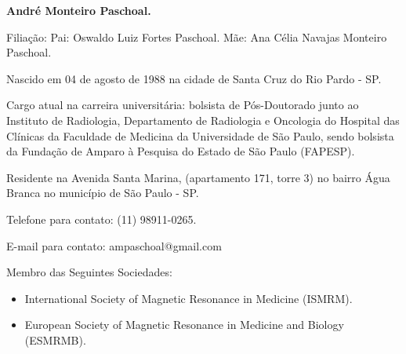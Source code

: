 \documentclass[a4paper,oneside,10pt]{article}
\begin{document}
\begin{itemize}
        \large{\item \textbf{André Monteiro Paschoal.}}
        \item Filiação: \newline
        Pai: Oswaldo Luiz Fortes Paschoal. \newline
        Mãe: Ana Célia Navajas Monteiro Paschoal.
        \item Nascido em 04 de agosto de 1988 na cidade de Santa Cruz do Rio Pardo - SP.
        \item Cargo atual na carreira universitária: bolsista de Pós-Doutorado junto ao Instituto de Radiologia, Departamento de Radiologia e Oncologia do Hospital das Clínicas da Faculdade de Medicina da Universidade de São Paulo, sendo bolsista da Fundação de Amparo à Pesquisa do Estado de São Paulo (FAPESP).
        \item Residente na Avenida Santa Marina, (apartamento 171, torre 3) no bairro Água Branca no município de São Paulo - SP.
        \item Telefone para contato: (11) 98911-0265.
        \item E-mail para contato: ampaschoal@gmail.com 
        \item Membro das Seguintes Sociedades:
        \begin{itemize}
                \item International Society of Magnetic Resonance in Medicine (ISMRM).
                \item European Society of Magnetic Resonance in Medicine and Biology (ESMRMB).
        \end{itemize} 
        
\end{itemize}

\newpage
\end{document}
